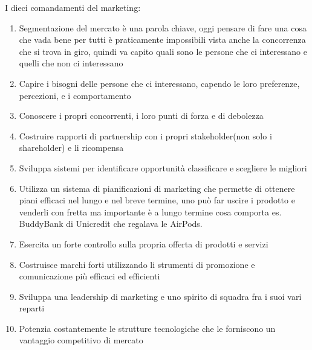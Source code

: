 \documentclass[11pt]{article}
\begin{document}
I dieci comandamenti del marketing:
\begin{enumerate}[noitemsep,topsep=0ex]
	\item Segmentazione del mercato è una parola chiave, oggi pensare di fare una cosa che vada bene per tutti è praticamente impossibili vista anche la concorrenza che si trova in giro, quindi va capito quali sono le persone che ci interessano e quelli che non ci interessano
	\item Capire i bisogni delle persone che ci interessano, capendo le loro preferenze, percezioni, e i comportamento
	\item Conoscere i propri concorrenti, i loro punti di forza e di debolezza
	\item Costruire rapporti di partnership con i propri stakeholder(non solo i shareholder) e li ricompensa
	\item Sviluppa sistemi per identificare opportunità classificare e scegliere le migliori
	\item Utilizza un sistema di pianificazioni di marketing che permette di ottenere piani efficaci nel lungo e nel breve termine, uno può far uscire i prodotto e venderli con fretta ma importante è a lungo termine cosa comporta es. BuddyBank di Unicredit che regalava le AirPods.
	\item Esercita un forte controllo sulla propria offerta di prodotti e servizi
	\item Costruisce marchi forti utilizzando li strumenti di promozione e comunicazione più efficaci ed efficienti
	\item Sviluppa una leadership di marketing e uno spirito di squadra fra i suoi vari reparti
	\item Potenzia costantemente le strutture tecnologiche che le forniscono un vantaggio competitivo di mercato
\end{enumerate}

~\\
\end{document}
